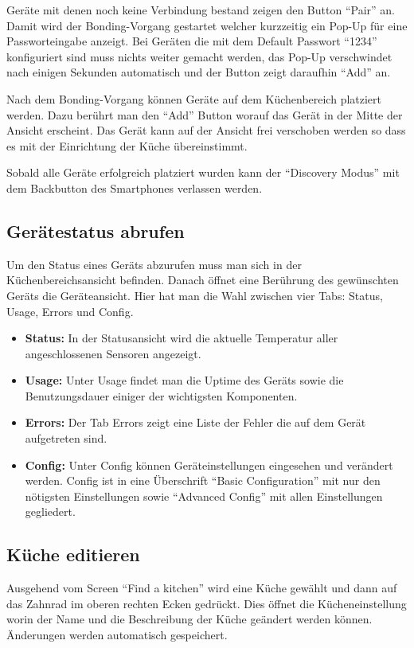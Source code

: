 Geräte mit denen noch keine Verbindung bestand zeigen den Button \enquote{Pair} an. Damit wird der Bonding-Vorgang gestartet welcher kurzzeitig ein Pop-Up für eine Passworteingabe anzeigt. Bei Geräten die mit dem Default Passwort \enquote{1234} konfiguriert sind muss nichts weiter gemacht werden, das Pop-Up verschwindet nach einigen Sekunden automatisch und der Button zeigt daraufhin \enquote{Add} an.

Nach dem Bonding-Vorgang können Geräte auf dem Küchenbereich platziert werden. Dazu berührt man den \enquote{Add} Button worauf das Gerät in der Mitte der Ansicht erscheint. Das Gerät kann auf der Ansicht frei verschoben werden so dass es mit der Einrichtung der Küche übereinstimmt. 

Sobald alle Geräte erfolgreich platziert wurden kann der \enquote{Discovery Modus} mit dem Backbutton des Smartphones verlassen werden.

\subsection{Gerätestatus abrufen}
Um den Status eines Geräts abzurufen muss man sich in der Küchenbereichsansicht befinden. Danach öffnet eine Berührung des gewünschten Geräts die Geräteansicht. Hier hat man die Wahl zwischen vier Tabs: Status, Usage, Errors und Config.

\begin{itemize}
\item \textbf{Status:}
In der Statusansicht wird die aktuelle Temperatur aller angeschlossenen Sensoren angezeigt. \\
\item \textbf{Usage:}
Unter Usage findet man die Uptime des Geräts sowie die Benutzungsdauer einiger der wichtigsten Komponenten. \\

\item \textbf{Errors:}
Der Tab Errors zeigt eine Liste der Fehler die auf dem Gerät aufgetreten sind. \\

\item \textbf{Config:}
Unter Config können Geräteinstellungen eingesehen und verändert werden. Config ist in eine Überschrift \enquote{Basic Configuration} mit nur den nötigsten Einstellungen sowie \enquote{Advanced Config} mit allen Einstellungen gegliedert.
\end{itemize}

\subsection{Küche editieren}
\label{subsec:kuecheEditieren}
Ausgehend vom Screen \enquote{Find a kitchen} wird eine Küche gewählt und dann auf das Zahnrad im oberen rechten Ecken gedrückt. Dies öffnet die Kücheneinstellung worin der Name und die Beschreibung der Küche geändert werden können. Änderungen werden automatisch gespeichert.

